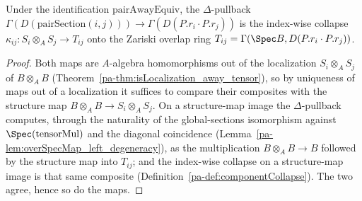 \begin{lemma}
  \label{pa-lem:pairAwayEquiv_appLE_diag}
  \leanok

  Under the identification \(\mathrm{pairAwayEquiv}\), the \(\Delta\)-pullback
  \(\Gamma(D(\mathrm{pairSection}(i, j))) \to \Gamma(D(P.r_i \cdot P.r_j))\) is the index-wise
  collapse \(\kappa_{ij} \colon S_i \otimes_A S_j \to T_{ij}\) onto the Zariski overlap ring
  \(T_{ij} = \Gamma(\Spec B, D(P.r_i \cdot P.r_j))\).
\end{lemma}
\begin{proof}
  \leanok
  Both maps are \(A\)-algebra homomorphisms out of the localization \(S_i \otimes_A S_j\) of
  \(B \otimes_A B\) (Theorem~\ref{pa-thm:isLocalization_away_tensor}), so by uniqueness of maps out
  of a localization it suffices to compare their composites with the structure map
  \(B \otimes_A B \to S_i \otimes_A S_j\). On a structure-map image the \(\Delta\)-pullback
  computes, through the naturality of the global-sections isomorphism against
  \(\Spec(\mathrm{tensorMul})\) and the diagonal coincidence
  (Lemma~\ref{pa-lem:overSpecMap_left_degeneracy}), as the multiplication \(B \otimes_A B \to B\)
  followed by the structure map into \(T_{ij}\); and the index-wise collapse on a structure-map
  image is that same composite (Definition~\ref{pa-def:componentCollapse}). The two agree, hence so
  do the maps.
\end{proof}

